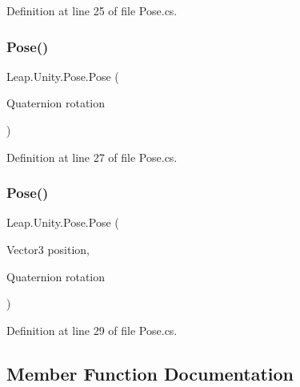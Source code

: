 Definition at line 25 of file Pose.\+cs.

\mbox{\label{struct_leap_1_1_unity_1_1_pose_a2762b68801a572f5b4e2b3afecaa1439}} 
\subsubsection{\texorpdfstring{Pose()}{Pose()}\hspace{0.1cm}{\footnotesize\ttfamily [2/3]}}
{\footnotesize\ttfamily Leap.\+Unity.\+Pose.\+Pose (\begin{DoxyParamCaption}\item[{Quaternion}]{rotation }\end{DoxyParamCaption})}



Definition at line 27 of file Pose.\+cs.

\mbox{\label{struct_leap_1_1_unity_1_1_pose_a5443bf51e7acbf3227e577a350c910a8}} 
\subsubsection{\texorpdfstring{Pose()}{Pose()}\hspace{0.1cm}{\footnotesize\ttfamily [3/3]}}
{\footnotesize\ttfamily Leap.\+Unity.\+Pose.\+Pose (\begin{DoxyParamCaption}\item[{Vector3}]{position,  }\item[{Quaternion}]{rotation }\end{DoxyParamCaption})}



Definition at line 29 of file Pose.\+cs.



\subsection{Member Function Documentation}
\mbox{\label{struct_leap_1_1_unity_1_1_pose_a91aece63d4aecbb41e9af8cf2795c63a}} 
